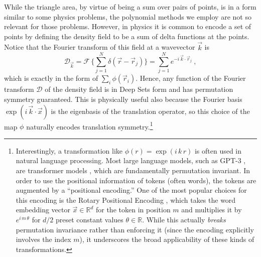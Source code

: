 \documentclass[10pt]{article}
\newcommand{\secbreak}{\bigskip{\centering\footnotesize%
\rotatebox[origin=c]{55}{$\triangle$}~~~%
\rotatebox[origin=c]{35}{$\triangle$}~~~%
\rotatebox[origin=c]{15}{$\triangle$}\par}\bigskip\noindent}
\begin{document}
\secbreak
While the triangle area, by virtue of being a sum over pairs of points, is in a form similar to some physics problems, the polynomial methods we employ are not so relevant for those problems.
However, in physics it is common to encode a set of points by defining the density field to be a sum of delta functions at the points.
Notice that the Fourier transform of this field at a wavevector $\vec{k}$ is
\begin{equation}
    \mathcal{D}_{\vec{k}} = \mathcal{F} \,\bigg\{
        \sum_{j=1}^{N} \delta(\vec{r} - \vec{r}_j)
    \bigg\}
    = \sum_{j=1}^{N} e^{-i \, \vec{k} \cdot \vec{r}_j}~,
\end{equation}
which is exactly in the form of $\sum_i \phi(\vec{r}_i)$.
Hence, any function of the Fourier transform $\mathcal{D}$ of the density field is in Deep Sets form and has permutation symmetry guaranteed.
This is physically useful also because the Fourier basis $\exp (i\, \vec{k}\cdot\vec{x})$ is the eigenbasis of the translation operator, so this choice of the map $\phi$ naturally encodes translation symmetry.\footnote{%
    Interestingly, a transformation like $\phi(r) = \exp(i\,k\,r)$ is often used in natural language processing.
    Most large language models, such as GPT-3 \citep{Brown2020GPT3}, are transformer models \citep{Vaswani2017Attention}, which are fundamentally permutation invariant.
    In order to use the positional information of tokens (often words), the tokens are augmented by a ``positional encoding.''
    One of the most popular choices for this encoding is the Rotary Positional Encoding \citep[RoPE;][]{Su2024Roformer}, which takes the word embedding vector $\vec{x} \in \mathbb{R}^{d}$ for the token in position $m$ and multiplies it by $e^{i \, m \, \theta}$ for $d/2$ preset constant values $\theta \in \mathbb{R}$.
    While this actually \emph{breaks} permutation invariance rather than enforcing it (since the encoding explicitly involves the index $m$), it underscores the broad applicability of these kinds of transformations.}
\end{document}
